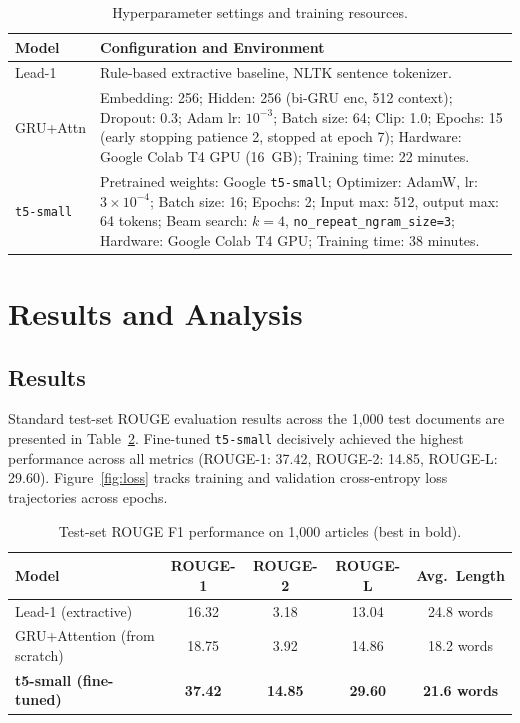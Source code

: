 \documentclass[conference,10pt,a4paper]{IEEEtran}
\begin{document}
\begin{table}[h]
\centering
\caption{Hyperparameter settings and training resources.}
\label{tab:hypers}
\small
\begin{tabular}{p{1.4cm}p{6.5cm}}
\toprule
Model & Configuration and Environment \\
\midrule
Lead-1 & Rule-based extractive baseline, NLTK sentence tokenizer. \\
GRU+Attn & Embedding: 256; Hidden: 256 (bi-GRU enc, 512 context); Dropout: 0.3; Adam lr: $10^{-3}$; Batch size: 64; Clip: 1.0; Epochs: 15 (early stopping patience 2, stopped at epoch 7); Hardware: Google Colab T4 GPU (16~GB); Training time: 22 minutes. \\
\texttt{t5-small} & Pretrained weights: Google \texttt{t5-small}; Optimizer: AdamW, lr: $3 \times 10^{-4}$; Batch size: 16; Epochs: 2; Input max: 512, output max: 64 tokens; Beam search: $k=4$, \texttt{no\_repeat\_ngram\_size=3}; Hardware: Google Colab T4 GPU; Training time: 38 minutes. \\
\bottomrule
\end{tabular}
\end{table}

\section{Results and Analysis}
\subsection{Results}
Standard test-set ROUGE evaluation results across the 1,000 test documents are presented in Table~\ref{tab:results}. Fine-tuned \texttt{t5-small} decisively achieved the highest performance across all metrics (ROUGE-1: 37.42, ROUGE-2: 14.85, ROUGE-L: 29.60). Figure~\ref{fig:loss} tracks training and validation cross-entropy loss trajectories across epochs.

\begin{table}[h]
\centering
\caption{Test-set ROUGE F1 performance on 1,000 articles (best in bold).}
\label{tab:results}
\small
\begin{tabular}{lcccc}
\toprule
Model & ROUGE-1 & ROUGE-2 & ROUGE-L & Avg.\ Length \\
\midrule
Lead-1 (extractive) & 16.32 & 3.18 & 13.04 & 24.8 words \\
GRU+Attention (from scratch) & 18.75 & 3.92 & 14.86 & 18.2 words \\
\textbf{t5-small (fine-tuned)} & \textbf{37.42} & \textbf{14.85} & \textbf{29.60} & \textbf{21.6 words} \\
\bottomrule
\end{tabular}
\end{table}
\end{document}
